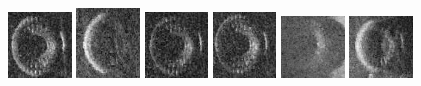 \begin{figure}
    \includegraphics[width=0.15\textwidth]{chapters/images/dataset/all-class-images/tire/tire-254.jpg}
    \includegraphics[width=0.15\textwidth]{chapters/images/dataset/all-class-images/tire/tire-68.jpg}
    \includegraphics[width=0.15\textwidth]{chapters/images/dataset/all-class-images/tire/tire-238.jpg}
    \includegraphics[width=0.15\textwidth]{chapters/images/dataset/all-class-images/tire/tire-324.jpg}
    \includegraphics[width=0.15\textwidth]{chapters/images/dataset/all-class-images/tire/tire-1.jpg}
    \includegraphics[width=0.15\textwidth]{chapters/images/dataset/all-class-images/tire/tire-174.jpg}
    

\end{figure}
